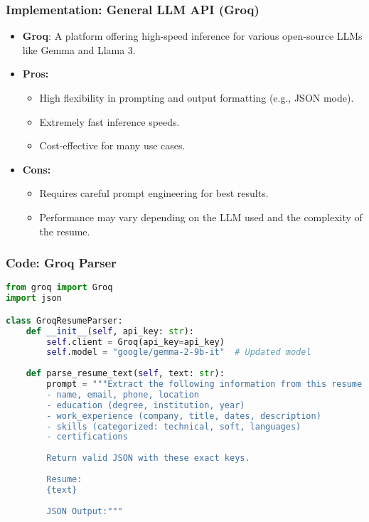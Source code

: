 \begin{frame}[fragile]\frametitle{Implementation: General LLM API (Groq)}
    \begin{itemize}
        \item \textbf{Groq}: A platform offering high-speed inference for various open-source LLMs like Gemma and Llama 3.
        \item \textbf{Pros:}
        \begin{itemize}
            \item High flexibility in prompting and output formatting (e.g., JSON mode).
            \item Extremely fast inference speeds.
            \item Cost-effective for many use cases.
        \end{itemize}
        \item \textbf{Cons:}
        \begin{itemize}
            \item Requires careful prompt engineering for best results.
            \item Performance may vary depending on the LLM used and the complexity of the resume.
        \end{itemize}
    \end{itemize}
\end{frame}


\begin{frame}[fragile]\frametitle{Code: Groq Parser}
    \begin{lstlisting}[language=Python, basicstyle=\tiny, caption={llm\_parsing\_groq.py}]
from groq import Groq
import json

class GroqResumeParser:
    def __init__(self, api_key: str):
        self.client = Groq(api_key=api_key)
        self.model = "google/gemma-2-9b-it"  # Updated model
    
    def parse_resume_text(self, text: str):
        prompt = """Extract the following information from this resume:
        - name, email, phone, location
        - education (degree, institution, year)
        - work_experience (company, title, dates, description)
        - skills (categorized: technical, soft, languages)
        - certifications
        
        Return valid JSON with these exact keys.
        
        Resume:
        {text}
        
        JSON Output:"""

    \end{lstlisting}
\end{frame}

